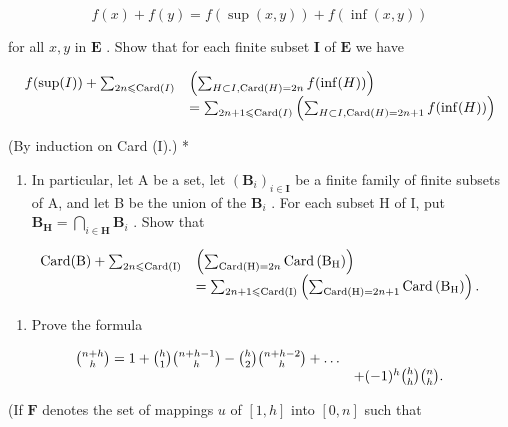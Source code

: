 \[
f (x) + f (y) = f (\sup (x, y)) + f (\inf (x, y))
\]

for all \(x, y\) in \(\mathbf{E}\) . Show that for each finite subset \(\mathbf{I}\) of \(\mathbf{E}\) we have

\[
\begin{array}{r l} f (\sup (I)) + \sum_ {2 n \leqslant \operatorname{Card} (I)} & \left(\sum_ {H \subset I, \operatorname{Card} (H) = 2 n} f (\inf (H))\right) \\ & = \sum_ {2 n + 1 \leqslant \operatorname{Card} (I)} \left(\sum_ {H \subset I, \operatorname{Card} (H) = 2 n + 1} f (\inf (H))\right) \end{array}
\]

(By induction on Card (I).) *

\begin{enumerate}
\def\labelenumi{(\alph{enumi})}
\setcounter{enumi}{1}
\tightlist
\item
  In particular, let A be a set, let \((\mathbf{B}_i)_{i\in \mathbf{I}}\) be a finite family of finite subsets of A, and let B be the union of the \(\mathbf{B}_i\) . For each subset H of I, put \(\mathbf{B}_{\mathbf{H}} = \bigcap_{i\in \mathbf{H}}\mathbf{B}_i\) . Show that
\end{enumerate}

\[
\begin{array}{r l} \operatorname{Card} (\mathrm{B}) + \sum_ {2 n \leqslant \operatorname{Card} (\mathrm{I})} & \left(\sum_ {\operatorname{Card} (\mathrm{H}) = 2 n} \operatorname{Card} \left(\mathrm{B} _ {\mathrm{H}}\right)\right) \\ & = \sum_ {2 n + 1 \leqslant \operatorname{Card} (\mathrm{I})} \left(\sum_ {\operatorname{Card} (\mathrm{H}) = 2 n + 1} \operatorname{Card} \left(\mathrm{B} _ {\mathrm{H}}\right)\right). \end{array}
\]

\begin{enumerate}
\def\labelenumi{\arabic{enumi}.}
\setcounter{enumi}{5}
\tightlist
\item
  Prove the formula
\end{enumerate}

\[
\begin{array}{r l} \binom {n + h} {h} = 1 + \binom {h} {1} \binom {n + h - 1} {h} - \binom {h} {2} \binom {n + h - 2} {h} + \dots \\ & + (- 1) ^ {h} \binom {h} {h} \binom {n} {h}. \end{array}
\]

(If \(\mathbf{F}\) denotes the set of mappings \(u\) of \([1, h]\) into \([0, n]\) such that

